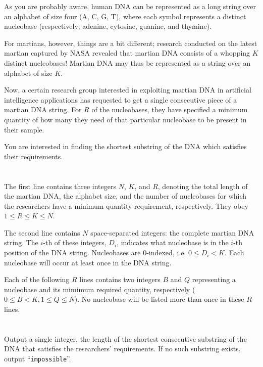 \ifx\boi\undefined\fi
\def\version{jury-1}
As you are probably aware, human DNA can be represented as a long string over
an alphabet of size four (A, C, G, T), where each symbol represents a
distinct nucleobase (respectively; adenine, cytosine, guanine, and thymine).

For martians, however, things are a bit different; research conducted on the
latest martian captured by NASA revealed that martian DNA consists of a
whopping $K$ distinct nucleobases! Martian DNA may thus be represented as a
string over an alphabet of size $K$.

Now, a certain research group interested in exploiting martian DNA in
artificial intelligence applications has requested to get a single consecutive
piece of a martian DNA string. For $R$ of the nucleobases, they have specified
a minimum quantity of how many they need of that particular nucleobase to be
present in their sample.

You are interested in finding the shortest substring of the DNA which satisfies their requirements.

\section*{}
The first line contains three integers $N$, $K$, and $R$, denoting the
total length of the martian DNA, the alphabet size, and the
number of nucleobases for which the researchers have a minimum quantity
requirement, respectively. They obey $1 \le R \le K \le N$.

The second line contains $N$ space-separated integers: the complete martian
DNA string. The $i$-th of these integers, $D_i$, indicates what nucleobase is
in the $i$-th position of the DNA string. Nucleobases are $0$-indexed, i.e. $0
\leq D_i < K$. Each nucleobase will occur at least once in the DNA string.

Each of the following $R$ lines contains two integers $B$ and $Q$ representing
a nucleobase and its mimimum required quantity, respectively ($0 \le B < K, 1 \le Q \le N$).
No nucleobase will be listed more than once in these $R$ lines.

\section*{\outputsection}
Output a single integer, the length of the shortest consecutive substring of
the DNA that satisfies the researchers' requirements. If no such substring
exists, output ``\texttt{impossible}''.

